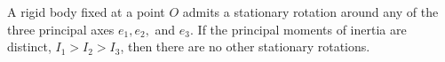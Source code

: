A rigid body fixed at a point $O$ admits a stationary rotation around any of the three principal axes $e_1, e_2,$ and $e_3$. If the principal moments of inertia are distinct, $I_1 > I_2 > I_3$, then there are no other stationary rotations.
